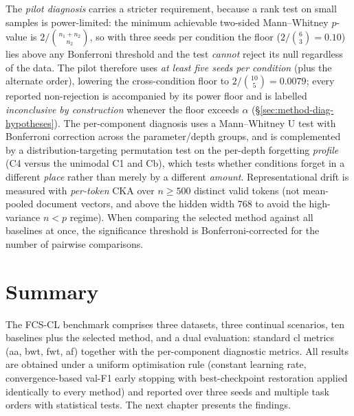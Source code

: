 The \emph{pilot diagnosis} carries a stricter requirement, because a rank test on
small samples is power-limited: the minimum achievable two-sided Mann--Whitney
$p$-value is $2/\binom{n_1+n_2}{n_2}$, so with three seeds per condition the floor
($2/\binom{6}{3}=0.10$) lies above any Bonferroni threshold and the test
\emph{cannot} reject its null regardless of the data. The pilot therefore uses
\emph{at least five seeds per condition} (plus the alternate order), lowering the
cross-condition floor to $2/\binom{10}{5}=0.0079$; every reported non-rejection is
accompanied by its power floor and is labelled \emph{inconclusive by construction}
whenever the floor exceeds $\alpha$ (\S\ref{sec:method-diag-hypotheses}). The
per-component diagnosis uses a Mann--Whitney U test with Bonferroni correction
across the parameter/depth groups, and is complemented by a distribution-targeting
permutation test on the per-depth forgetting \emph{profile} (C4 versus the unimodal
C1 and Cb), which tests whether conditions forget in a different \emph{place} rather
than merely by a different \emph{amount}. Representational drift is measured with
\emph{per-token} CKA over $n\ge 500$ distinct valid tokens (not mean-pooled document
vectors, and above the hidden width $768$ to avoid the high-variance $n<p$ regime).
When comparing the selected method against all baselines at once, the significance
threshold is Bonferroni-corrected for the number of pairwise comparisons.

\section{Summary}
\label{sec:exp-summary}

The FCS-CL benchmark comprises three datasets, three continual scenarios, ten
baselines plus the selected method, and a dual evaluation: standard \gls{cl}
metrics (\gls{aa}, \gls{bwt}, \gls{fwt}, \gls{af}) together with the per-component
diagnostic metrics. All results are obtained under a uniform optimisation rule
(constant learning rate, convergence-based val-F1 early stopping with best-checkpoint
restoration applied identically to every method) and reported over three seeds and
multiple task orders with statistical tests. The next chapter presents the findings.

